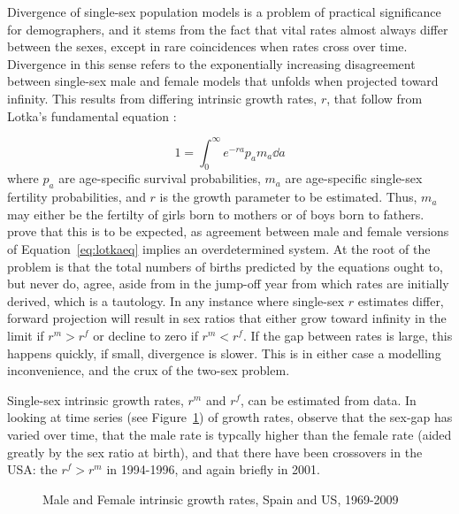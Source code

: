 
Divergence of single-sex population models is a problem of practical
significance for demographers, and it stems from the fact that vital rates almost always
differ between the sexes, except in rare coincidences when rates cross over
time. Divergence in this sense refers to the exponentially increasing
disagreement between single-sex male and female models that unfolds when
projected toward infinity. This results from differing intrinsic growth rates,
$r$, that follow from Lotka's fundamental equation \citep{sharpe1911problem}:

\begin{equation}
\label{eq:lotkaeq}
1 = \int _0 ^\infty e^{-ra}p_a m_a \dd a 
\end{equation}
where $p_a$ are age-specific survival probabilities, $m_a$ are age-specific
single-sex fertility probabilities, and $r$ is the growth parameter to be
estimated. Thus, $m_a$ may either be the fertilty of girls born to mothers or of
boys born to fathers. \citet{yellin1977comparison} prove that this is to be
expected, as agreement between male and female versions of
 Equation~\eqref{eq:lotkaeq} implies an overdetermined
system. At the root of the problem is that the total numbers of births predicted
by the equations ought to, but never do, agree, aside from in the jump-off year
from which rates are initially derived, which is a tautology. In any instance
where single-sex $r$ estimates differ, forward projection will result in sex ratios 
that either grow toward infinity in the limit if $r^m
> r^f$ or decline to zero if $r^m < r^f$. If the gap between rates is large, this happens
quickly, if small, divergence is slower. This is in either case a modelling
inconvenience, and the crux of the two-sex problem. 

Single-sex intrinsic growth rates, $r^m$ and $r^f$, can be 
estimated from data. In looking at time series (see Figure~\ref{fig:rmf}) of 
 growth rates, observe that the sex-gap has varied over 
time, that the male rate is typcally higher than the female rate (aided greatly 
by the sex ratio at birth), and that there have been crossovers in the USA: 
the $r^f > r^m$ in 1994-1996, and again briefly in 2001. 

\begin{figure}[ht!]
        \centering  
          \caption{Male and Female intrinsic growth rates, Spain and US,
          1969-2009}
          \label{fig:rmf}
\end{figure}

